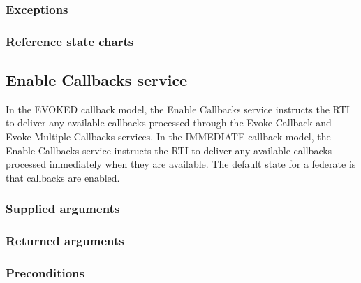 \begin{compactstdpage}

    \subsubsection{Exceptions}


    \subsubsection{Reference state charts}


    \subsection{Enable Callbacks service}

    In the EVOKED callback model, the Enable Callbacks service instructs the RTI to deliver any available callbacks processed through the Evoke Callback and Evoke Multiple Callbacks services. In the IMMEDIATE callback model, the Enable Callbacks service instructs the RTI to deliver any available callbacks processed immediately when they are available. The default state for a federate is that callbacks are enabled.

    \subsubsection{Supplied arguments}


    \subsubsection{Returned arguments}


    \subsubsection{Preconditions}



\end{compactstdpage}
